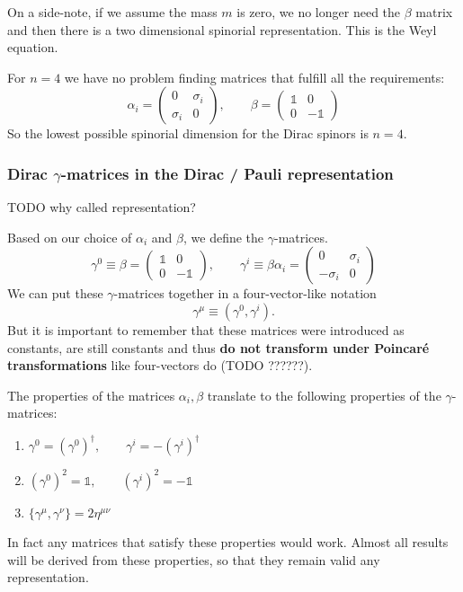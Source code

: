 \begin{note}
On a side-note, if we assume the mass $m$ is zero, we no longer need the $\beta$ matrix and then there is a two dimensional spinorial representation. This is the Weyl equation.
\end{note}

For $n = 4$ we have no problem finding matrices that fulfill all the requirements:
\[ \alpha_i = \begin{pmatrix}
0 & \sigma_i \\ \sigma_i & 0
\end{pmatrix}, \qquad \beta = \begin{pmatrix}
\mathbb{1} & 0 \\ 0 & -\mathbb{1}
\end{pmatrix} \]
So the lowest possible spinorial dimension for the Dirac spinors is $n=4$.

\subsubsection{Dirac $\gamma$-matrices in the Dirac / Pauli representation}
TODO why called representation?

Based on our choice of $\alpha_i$ and $\beta$, we define the $\gamma$-matrices.
\[ \gamma^0 \equiv \beta = \begin{pmatrix}
\mathbb{1} & 0 \\ 0 & -\mathbb{1}
\end{pmatrix}, \qquad \gamma^i \equiv \beta\alpha_i = \begin{pmatrix}
0& \sigma_i \\ -\sigma_i & 0
\end{pmatrix} \]
We can put these $\gamma$-matrices together in a four-vector-like notation
\[ \gamma^\mu \equiv (\gamma^0, \gamma^i). \]
But it is important to remember that these matrices were introduced as constants, are still constants and thus \textbf{do not transform under Poincaré transformations} like four-vectors do (TODO ??????).

The properties of the matrices $\alpha_i, \beta$ translate to the following properties of the $\gamma$-matrices:
\begin{enumerate}
\item $\gamma^0 = (\gamma^0)^\dagger, \qquad \gamma^i = - (\gamma^i)^\dagger$
\item $(\gamma^0)^2 = \mathbb{1}, \qquad (\gamma^i)^2 = -\mathbb{1}$
\item $\{ \gamma^\mu, \gamma^\nu \} = 2\eta^{\mu\nu}$
\end{enumerate}
In fact any matrices that satisfy these properties would work. Almost all results will be derived from these properties, so that they remain valid any representation.

